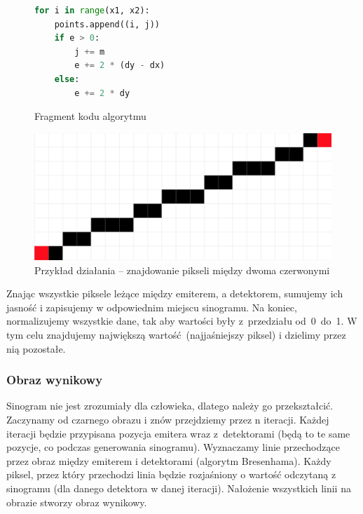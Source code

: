 \documentclass[polish,polish,a4paper]{article}
\begin{document}
				\begin{figure}[!h]
					\centering
					\begin{minipage}{0.4\linewidth}
						\begin{lstlisting}[language=Python, frame=single]
for i in range(x1, x2):
    points.append((i, j))
    if e > 0:
        j += m
        e += 2 * (dy - dx)
    else:
        e += 2 * dy
						\end{lstlisting}
						\caption{Fragment kodu algorytmu}
					\end{minipage}
					\hfill
					\begin{minipage}{0.45\linewidth}
						\includegraphics[width=\textwidth]{img/bresenham.png}
						\caption{Przykład działania -- znajdowanie pikseli między dwoma czerwonymi}
					\end{minipage}
				\end{figure}
				
				Znając wszystkie piksele leżące między emiterem, a detektorem, 
				sumujemy ich jasność i zapisujemy w odpowiednim miejscu sinogramu.
				Na koniec, normalizujemy wszystkie dane, tak aby wartości były z~przedziału od~0~do~1.
				 W tym celu znajdujemy największą wartość (najjaśniejszy piksel) i dzielimy przez nią pozostałe.
				
				\subsubsection{Obraz wynikowy}
					Sinogram nie jest zrozumiały dla człowieka, 
					dlatego należy go przekształcić.
					Zaczynamy od czarnego obrazu i znów przejdziemy przez n iteracji.
					Każdej iteracji będzie przypisana pozycja emitera wraz z~detektorami 
					(będą to te same pozycje, co podczas generowania sinogramu).
					Wyznaczamy linie przechodzące przez obraz między emiterem i detektorami (algorytm Bresenhama).
					Każdy piksel, przez który przechodzi linia będzie rozjaśniony o wartość odczytaną z sinogramu 
					(dla danego detektora w danej iteracji). 
					Nałożenie wszystkich linii na obrazie stworzy obraz wynikowy.
				
\end{document}
